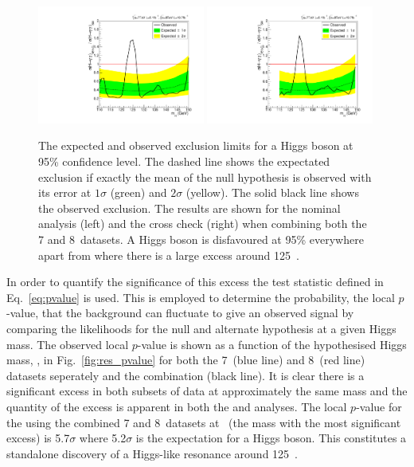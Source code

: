 \begin{figure}
  \includegraphics[width=0.49\textwidth]{results/plots/mva_limit.pdf}
  \includegraphics[width=0.49\textwidth]{results/plots/sideband_limit.pdf}
  \caption[The expected and observed exclusion limits for a \SM Higgs boson at 95\& confidence level]{The expected and observed exclusion limits for a \SM Higgs boson at 95\% confidence level. The dashed line shows the expectated exclusion if exactly the mean of the null hypothesis is observed with its error at $1\sigma$ (green) and $2\sigma$ (yellow). The solid black line shows the observed exclusion. The results are shown for the nominal \MFM analysis (left) and the cross check \SMVA (right) when combining both the 7 and 8~\TeV datasets. A \SM Higgs boson is disfavoured at 95\% everywhere apart from where there is a large excess around 125~\GeV.}
  \label{fig:res_exclusion}
\end{figure}

In order to quantify the significance of this excess the test statistic defined in Eq.~\ref{eq:pvalue} is used. This is employed to determine the probability, the local $p$-value, that the background can fluctuate to give an observed signal by comparing the likelihoods for the null and alternate hypothesis at a given Higgs mass. The observed local $p$-value is shown as a function of the hypothesised Higgs mass, \mH, in Fig.~\ref{fig:res_pvalue} for both the 7~\TeV (blue line) and 8~\TeV (red line) datasets seperately and the combination (black line). It is clear there is a significant excess in both subsets of data at approximately the same mass and the quantity of the excess is apparent in both the \MFM and \SMVA analyses. The local $p$-value for the \MFM using the combined 7 and 8~\TeV datasets at ~\GeV (the mass with the most significant excess) is 5.7$\sigma$ where 5.2$\sigma$ is the expectation for a \SM Higgs boson. This constitutes a standalone discovery of a Higgs-like resonance around 125~\GeV.


